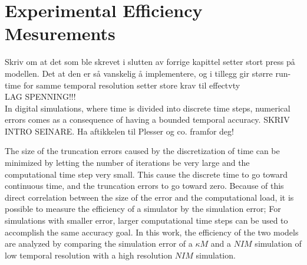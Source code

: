 \documentclass[b5paper,12 pt]{report}
\begin{document}

		
		
		



	
	\chapter{Experimental Efficiency Mesurements}
	\label{chExperimentalEfficiencyMeasurement}
		Skriv om at det som ble skrevet i slutten av forrige kapittel setter stort press på modellen. Det at den er så vanskelig å implementere, og i tillegg gir større run-time for samme temporal resolution setter store krav til effectvty
\\ LAG SPENNING!!!
\\

		In digital simulations, where time is divided into discrete time steps, numerical errors comes as a consequence of having a bounded temporal accuracy. %
		SKRIV INTRO SEINARE. Ha aftikkelen til Plesser og co. framfor deg! %




The size of the truncation errors caused by the discretization of time can be minimized by letting the number of iterations be very large and the computational time step very small.
This cause the discrete time to go toward continuous time, and the truncation errors to go toward zero. %
Because of this direct correlation between the size of the error and the computational load, it is possible to measure the efficiency of a simulator by the simulation error;
	For simulations with smaller error, larger computational time steps can be used to accomplish the same accuracy goal.
In this work, the efficiency of the two models are analyzed by comparing the simulation error of a $\kappa M$ and a $NIM$ simulation of low temporal resolution with a high resolution $NIM$ simulation. %
\end{document}
